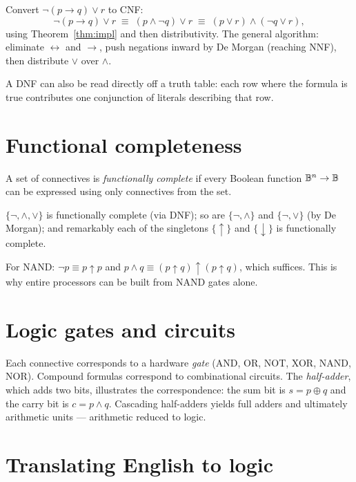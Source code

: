 \begin{example}\label{ex:cnf}
Convert $\neg(p \to q) \vee r$ to CNF:
\[
\neg(p \to q) \vee r
\;\equiv\; (p \wedge \neg q) \vee r
\;\equiv\; (p \vee r) \wedge (\neg q \vee r),
\]
using Theorem~\ref{thm:impl} and then distributivity. The general algorithm:
eliminate $\leftrightarrow$ and $\to$, push negations inward by De Morgan
(reaching NNF), then distribute $\vee$ over $\wedge$.
\end{example}

A DNF can also be read directly off a truth table: each row where the formula
is true contributes one conjunction of literals describing that row.

\section{Functional completeness}

\begin{definition}
A set of connectives is \emph{functionally complete} if every Boolean function
$\mathbb{B}^n \to \mathbb{B}$ can be expressed using only connectives from the set.
\end{definition}

\begin{theorem}
$\{\neg, \wedge, \vee\}$ is functionally complete (via DNF); so are
$\{\neg, \wedge\}$ and $\{\neg, \vee\}$ (by De Morgan); and remarkably each of
the singletons $\{\uparrow\}$ and $\{\downarrow\}$ is functionally complete.
\end{theorem}

For NAND: $\neg p \equiv p \uparrow p$ and
$p \wedge q \equiv (p \uparrow q) \uparrow (p \uparrow q)$, which suffices.
This is why entire processors can be built from NAND gates alone.

\section{Logic gates and circuits}

Each connective corresponds to a hardware \emph{gate} (AND, OR, NOT, XOR,
NAND, NOR). Compound formulas correspond to combinational circuits. The
\emph{half-adder}, which adds two bits, illustrates the correspondence: the sum
bit is $s = p \oplus q$ and the carry bit is $c = p \wedge q$. Cascading
half-adders yields full adders and ultimately arithmetic units --- arithmetic
reduced to logic.

\section{Translating English to logic}

